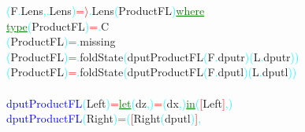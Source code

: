 \textcolor{cyan}{(}{\rm{}F}\textcolor{cyan}{.}{\rm{}Lens}\textcolor{cyan}{,}\textcolor{cyan}{.}{\rm{}Lens}\textcolor{cyan}{)}\hsspace \textcolor{red}{=\ensuremath{\rangle}}\textcolor{cyan}{.}{\rm{}Lens}\hsspace \textcolor{cyan}{(}{\rm{}ProductFL}\textcolor{cyan}{)}\hsspace \textcolor{green}{\underline{where}}\\\hstab \textcolor{green}{\underline{type}}\hsspace \hsspace \textcolor{cyan}{(}{\rm{}ProductFL}\textcolor{cyan}{)}\hsspace \textcolor{red}{=}\textcolor{cyan}{.}{\rm{}C}\\\hsspace \textcolor{cyan}{(}{\rm{}ProductFL}\textcolor{cyan}{)}\hsspace \textcolor{red}{=}\textcolor{cyan}{.}{\rm{}missing}\\\hsspace \hsspace \hsspace \textcolor{cyan}{(}{\rm{}ProductFL}\textcolor{cyan}{)}\hsspace \textcolor{red}{=}\textcolor{cyan}{.}{\rm{}foldState}\hsspace \textcolor{cyan}{(}{\rm{}dputProductFL}\hsspace \textcolor{cyan}{(}{\rm{}F}\textcolor{cyan}{.}{\rm{}dputr}\textcolor{cyan}{)}\hsspace \textcolor{cyan}{(}{\rm{}L}\textcolor{cyan}{.}{\rm{}dputr}\textcolor{cyan}{)}\textcolor{cyan}{)}\\\hsspace \hsspace \hsspace \textcolor{cyan}{(}{\rm{}ProductFL}\textcolor{cyan}{)}\hsspace \textcolor{red}{=}\textcolor{cyan}{.}{\rm{}foldState}\hsspace \textcolor{cyan}{(}{\rm{}dputProductFL}\hsspace \textcolor{cyan}{(}{\rm{}F}\textcolor{cyan}{.}{\rm{}dputl}\textcolor{cyan}{)}\hsspace \textcolor{cyan}{(}{\rm{}L}\textcolor{cyan}{.}{\rm{}dputl}\textcolor{cyan}{)}\textcolor{cyan}{)}\\\\\textcolor{blue}{dputProductFL}\hsspace \textcolor{cyan}{(}{\rm{}Left}\hsspace {}\textcolor{cyan}{)}\hsspace \textcolor{red}{=}\hsspace \textcolor{green}{\underline{let}}\hsspace \textcolor{cyan}{(}{\rm{}dz}\textcolor{cyan}{,}\textcolor{cyan}{)}\hsspace \textcolor{red}{=}\hsspace \textcolor{cyan}{(}{\rm{}dx}\textcolor{cyan}{,}\textcolor{cyan}{)}\hsspace \textcolor{green}{\underline{in}}\hsspace \textcolor{cyan}{(}\textcolor{red}{[}{\rm{}Left}\textcolor{red}{]}\textcolor{cyan}{,}\textcolor{cyan}{)}\\\textcolor{blue}{dputProductFL}\hsspace \textcolor{cyan}{(}{\rm{}Right}\textcolor{cyan}{)}\hsspace \textcolor{red}{=}\hsspace \textcolor{cyan}{(}\textcolor{red}{[}{\rm{}Right}\hsspace \textcolor{cyan}{(}{\rm{}dputl}\textcolor{cyan}{)}\textcolor{red}{]}\textcolor{cyan}{,}\hsspace 